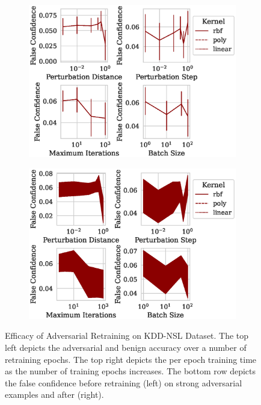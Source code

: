 \documentclass[fonts]{icst}
\begin{document}
\begin{appendices}
\begin{figure}[h!]
\begin{subfigure}{0.47\textwidth}
     \end{subfigure}
     \hfill
     \begin{subfigure}{0.47\textwidth}
         \centering
         \includegraphics[width=\textwidth]{./kdd-nsl/confidence_vs_attack_parameters.eps}
     \end{subfigure}
     \hfill
     \begin{subfigure}{0.47\textwidth}
         \centering
         \includegraphics[width=\textwidth]{./kdd-nsl/retrain_confidence_vs_attack_parameters.eps}
     \end{subfigure}
     \hfill
     \caption{Efficacy of Adversarial Retraining on KDD-NSL Dataset. The top left depicts the adversarial and benign accuracy over a number of retraining epochs. The top right depicts the per epoch training time as the number of training epochs increases. The bottom row depicts the false confidence before retraining (left) on strong adversarial examples and after (right).}
     \label{fig:kdd-nsl}
\end{figure}
\pagebreak
\onecolumn

\end{appendices}
\end{document}
